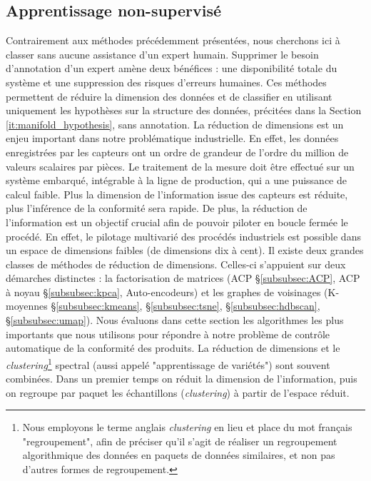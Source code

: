 \subsection{Apprentissage non-supervisé} \label{subsec:unsupervised}
Contrairement aux méthodes précédemment présentées, nous cherchons ici à classer sans aucune assistance d'un expert humain.
Supprimer le besoin d'annotation d'un expert amène deux bénéfices : une disponibilité totale du système et une suppression des risques d'erreurs humaines.
Ces méthodes permettent de réduire la dimension des données et de classifier en utilisant uniquement les hypothèses sur la structure des données, précitées dans la Section \ref{it:manifold_hypothesis}, sans annotation.
La réduction de dimensions est un enjeu important dans notre problématique industrielle.
En effet, les données enregistrées par les capteurs ont un ordre de grandeur de l'ordre du million de valeurs scalaires par pièces.
Le traitement de la mesure doit être effectué sur un système embarqué, intégrable à la ligne de production, qui a une puissance de calcul faible.
Plus la dimension de l'information issue des capteurs est réduite, plus l'inférence de la conformité sera rapide.
De plus, la réduction de l'information est un objectif crucial afin de pouvoir piloter en boucle fermée le procédé.
En effet, le pilotage multivarié des procédés industriels est possible dans un espace de dimensions faibles (de dimensions dix à cent).
Il existe deux grandes classes de méthodes de réduction de dimensions.
Celles-ci s'appuient sur deux démarches distinctes : la factorisation de matrices (ACP §\ref{subsubsec:ACP}, ACP à noyau §\ref{subsubsec:kpca}, Auto-encodeurs) et les graphes de voisinages (K-moyennes §\ref{subsubsec:kmeans}, §\ref{subsubsec:tsne}, §\ref{subsubsec:hdbscan}, §\ref{subsubsec:umap}).
Nous évaluons dans cette section les algorithmes les plus importants que nous utilisons pour répondre à notre problème de contrôle automatique de la conformité des produits.
La réduction de dimensions et le \textit{clustering}\footnote{Nous employons le terme anglais \textit{clustering} en lieu et place du mot français "regroupement", afin de préciser qu'il s'agit de réaliser un regroupement algorithmique des données en paquets de données similaires, et non pas d'autres formes de regroupement.} spectral (aussi appelé "apprentissage de variétés") sont souvent combinées.
Dans un premier temps on réduit la dimension de l'information, puis on regroupe par paquet les échantillons (\textit{clustering}) à partir de l'espace réduit.

